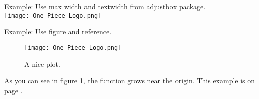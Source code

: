 \documentclass[letterpaper, oneside]{book}
\begin{document}
	Example: Use max width and textwidth from adjustbox package. \\
	\texttt{[image: One\_Piece\_Logo.png]}  
	
	Example: Use figure and reference.
	\begin{figure}[h]
		\centering
		\texttt{[image: One\_Piece\_Logo.png]}
		\caption{A nice plot.}
		\label{fig:mesh1}
	\end{figure}
	
	As you can see in figure \ref{fig:mesh1}, the function grows near the origin. This example is on page \pageref{fig:mesh1}.
	
	


		
	
	
	
	
	
\end{document}
